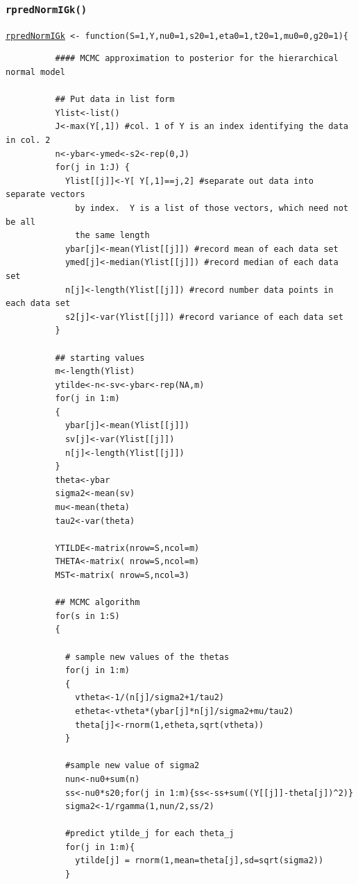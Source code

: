 \documentclass[12pt, a4paper]{article}
\begin{document}
    \subsubsection{\texttt{rpredNormIGk()}}\label{sec:rpredNormIGk}

    \texttt{\hyperref[sec:NormIGkimp]{rpredNormIGk} <- function(S=1,Y,nu0=1,s20=1,eta0=1,t20=1,mu0=0,g20=1)\{ }

              \begin{verbatim}
          #### MCMC approximation to posterior for the hierarchical normal model

          ## Put data in list form
          Ylist<-list()
          J<-max(Y[,1]) #col. 1 of Y is an index identifying the data in col. 2
          n<-ybar<-ymed<-s2<-rep(0,J)
          for(j in 1:J) {
            Ylist[[j]]<-Y[ Y[,1]==j,2] #separate out data into separate vectors
              by index.  Y is a list of those vectors, which need not be all
              the same length
            ybar[j]<-mean(Ylist[[j]]) #record mean of each data set
            ymed[j]<-median(Ylist[[j]]) #record median of each data set
            n[j]<-length(Ylist[[j]]) #record number data points in each data set
            s2[j]<-var(Ylist[[j]]) #record variance of each data set
          }

          ## starting values
          m<-length(Ylist)
          ytilde<-n<-sv<-ybar<-rep(NA,m)
          for(j in 1:m)
          {
            ybar[j]<-mean(Ylist[[j]])
            sv[j]<-var(Ylist[[j]])
            n[j]<-length(Ylist[[j]])
          }
          theta<-ybar
          sigma2<-mean(sv)
          mu<-mean(theta)
          tau2<-var(theta)

          YTILDE<-matrix(nrow=S,ncol=m)
          THETA<-matrix( nrow=S,ncol=m)
          MST<-matrix( nrow=S,ncol=3)

          ## MCMC algorithm
          for(s in 1:S)
          {

            # sample new values of the thetas
            for(j in 1:m)
            {
              vtheta<-1/(n[j]/sigma2+1/tau2)
              etheta<-vtheta*(ybar[j]*n[j]/sigma2+mu/tau2)
              theta[j]<-rnorm(1,etheta,sqrt(vtheta))
            }

            #sample new value of sigma2
            nun<-nu0+sum(n)
            ss<-nu0*s20;for(j in 1:m){ss<-ss+sum((Y[[j]]-theta[j])^2)}
            sigma2<-1/rgamma(1,nun/2,ss/2)

            #predict ytilde_j for each theta_j
            for(j in 1:m){
              ytilde[j] = rnorm(1,mean=theta[j],sd=sqrt(sigma2))
            }


\end{verbatim}
\end{document}
